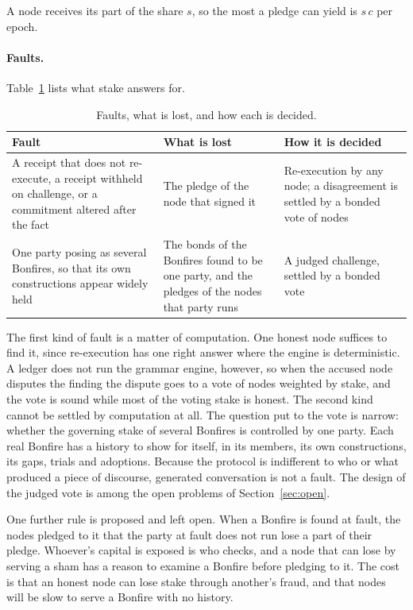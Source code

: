 A node receives its part of the share $s$, so the most a pledge can yield is $s\,c$ per epoch.

\paragraph{Faults.} Table~\ref{tab:faults} lists what stake answers for.

\begin{table}[!htb]
\centering\small
\begin{tabularx}{\textwidth}{@{}p{}p{}X@{}}
\toprule
\textbf{Fault} & \textbf{What is lost} & \textbf{How it is decided} \\
\midrule
A receipt that does not re-execute, a receipt withheld on challenge, or a commitment altered after the fact &
The pledge of the node that signed it &
Re-execution by any node; a disagreement is settled by a bonded vote of nodes \\
\addlinespace
One party posing as several Bonfires, so that its own constructions appear widely held &
The bonds of the Bonfires found to be one party, and the pledges of the nodes that party runs &
A judged challenge, settled by a bonded vote \\
\bottomrule
\end{tabularx}
\caption{Faults, what is lost, and how each is decided.}\label{tab:faults}
\end{table}

The first kind of fault is a matter of computation. One honest node suffices to find it, since re-execution has one right answer where the engine is deterministic. A ledger does not run the grammar engine, however, so when the accused node disputes the finding the
dispute goes to a vote of nodes weighted by stake, and the vote is sound while most of the voting stake is honest.
The second kind cannot be settled by computation at all. The question put to the vote is narrow: whether the
governing stake of several Bonfires is controlled by one party. Each real Bonfire has a history to show for
itself, in its members, its own constructions, its gaps, trials and adoptions. Because the protocol is indifferent
to who or what produced a piece of discourse, generated conversation is not a fault. The design of the judged vote
is among the open problems of Section~\ref{sec:open}.

One further rule is proposed and left open. When a Bonfire is found at fault, the nodes pledged to it that the
party at fault does not run lose a part of their pledge. Whoever's capital is exposed is who checks, and a node
that can lose by serving a sham has a reason to examine a Bonfire before pledging to it. The cost is that an
honest node can lose stake through another's fraud, and that nodes will be slow to serve a Bonfire with no history.

